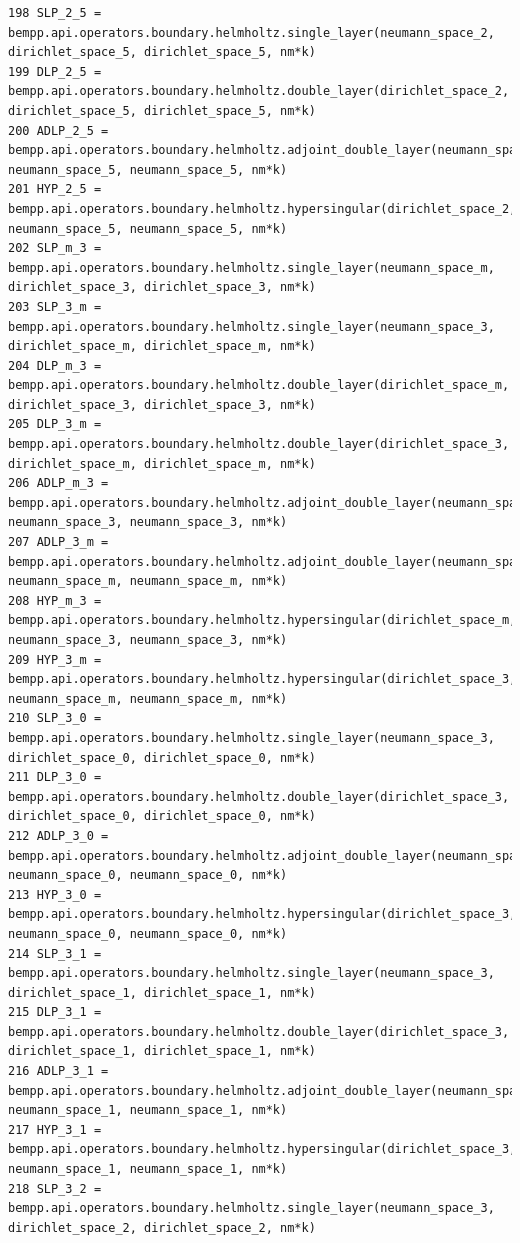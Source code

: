\documentclass[12pt,letterpaper]{article}
\numberwithin{equation}{section}
\begin{document}
\begin{lstlisting}
198 SLP_2_5 = bempp.api.operators.boundary.helmholtz.single_layer(neumann_space_2, dirichlet_space_5, dirichlet_space_5, nm*k)
199 DLP_2_5 = bempp.api.operators.boundary.helmholtz.double_layer(dirichlet_space_2, dirichlet_space_5, dirichlet_space_5, nm*k)
200 ADLP_2_5 = bempp.api.operators.boundary.helmholtz.adjoint_double_layer(neumann_space_2, neumann_space_5, neumann_space_5, nm*k)
201 HYP_2_5 = bempp.api.operators.boundary.helmholtz.hypersingular(dirichlet_space_2, neumann_space_5, neumann_space_5, nm*k)
202 SLP_m_3 = bempp.api.operators.boundary.helmholtz.single_layer(neumann_space_m, dirichlet_space_3, dirichlet_space_3, nm*k)
203 SLP_3_m = bempp.api.operators.boundary.helmholtz.single_layer(neumann_space_3, dirichlet_space_m, dirichlet_space_m, nm*k)
204 DLP_m_3 = bempp.api.operators.boundary.helmholtz.double_layer(dirichlet_space_m, dirichlet_space_3, dirichlet_space_3, nm*k)
205 DLP_3_m = bempp.api.operators.boundary.helmholtz.double_layer(dirichlet_space_3, dirichlet_space_m, dirichlet_space_m, nm*k)
206 ADLP_m_3 = bempp.api.operators.boundary.helmholtz.adjoint_double_layer(neumann_space_m, neumann_space_3, neumann_space_3, nm*k)
207 ADLP_3_m = bempp.api.operators.boundary.helmholtz.adjoint_double_layer(neumann_space_3, neumann_space_m, neumann_space_m, nm*k)
208 HYP_m_3 = bempp.api.operators.boundary.helmholtz.hypersingular(dirichlet_space_m, neumann_space_3, neumann_space_3, nm*k)
209 HYP_3_m = bempp.api.operators.boundary.helmholtz.hypersingular(dirichlet_space_3, neumann_space_m, neumann_space_m, nm*k)
210 SLP_3_0 = bempp.api.operators.boundary.helmholtz.single_layer(neumann_space_3, dirichlet_space_0, dirichlet_space_0, nm*k)
211 DLP_3_0 = bempp.api.operators.boundary.helmholtz.double_layer(dirichlet_space_3, dirichlet_space_0, dirichlet_space_0, nm*k)
212 ADLP_3_0 = bempp.api.operators.boundary.helmholtz.adjoint_double_layer(neumann_space_3, neumann_space_0, neumann_space_0, nm*k)
213 HYP_3_0 = bempp.api.operators.boundary.helmholtz.hypersingular(dirichlet_space_3, neumann_space_0, neumann_space_0, nm*k)
214 SLP_3_1 = bempp.api.operators.boundary.helmholtz.single_layer(neumann_space_3, dirichlet_space_1, dirichlet_space_1, nm*k)
215 DLP_3_1 = bempp.api.operators.boundary.helmholtz.double_layer(dirichlet_space_3, dirichlet_space_1, dirichlet_space_1, nm*k)
216 ADLP_3_1 = bempp.api.operators.boundary.helmholtz.adjoint_double_layer(neumann_space_3, neumann_space_1, neumann_space_1, nm*k)
217 HYP_3_1 = bempp.api.operators.boundary.helmholtz.hypersingular(dirichlet_space_3, neumann_space_1, neumann_space_1, nm*k)
218 SLP_3_2 = bempp.api.operators.boundary.helmholtz.single_layer(neumann_space_3, dirichlet_space_2, dirichlet_space_2, nm*k)

\end{lstlisting}
\end{document}
